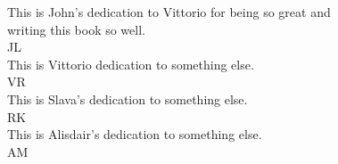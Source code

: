 \thispagestyle{empty}
\vspace*{\fill}
\begin{center}This is John's dedication to Vittorio for being so great and \\
writing this book so well.\\
JL\\
\vspace*{3pc}
This is Vittorio dedication to something else. \\[1ex]
VR\\
\vspace*{3pc}
This is Slava's dedication to something else. \\[1ex]
RK\\
\vspace*{3pc}
This is Alisdair's dedication to something else. \\[1ex]
AM\\
\end{center}
\vspace*{\fill}
